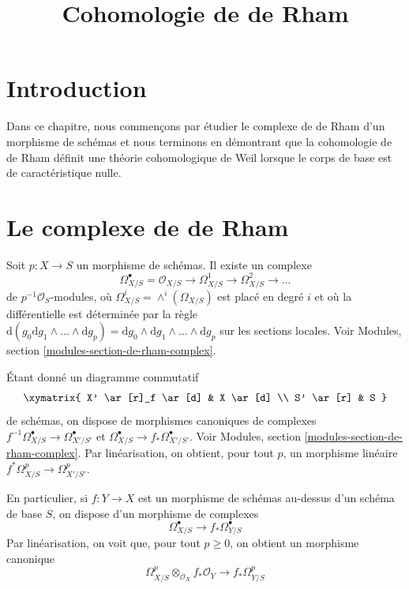 

%


\title{Cohomologie de de Rham}


\maketitle

\label{section-phantom}

\tableofcontents

\section{Introduction}
\label{section-introduction}

\noindent
Dans ce chapitre, nous commençons par étudier le complexe de de Rham
d'un morphisme de schémas et nous terminons en démontrant que la cohomologie
de de Rham définit une théorie cohomologique de Weil lorsque le corps de base est de caractéristique nulle.




\section{Le complexe de de Rham}
\label{section-de-rham-complex}

\noindent
Soit $p : X \to S$ un morphisme de schémas. Il existe un complexe
$$
\Omega^\bullet_{X/S} =
\mathcal{O}_{X/S} \to \Omega^1_{X/S} \to \Omega^2_{X/S} \to \ldots
$$
de $p^{-1}\mathcal{O}_S$-modules, où
$\Omega^i_{X/S} = \wedge^i(\Omega_{X/S})$
est placé en degré $i$ et où la différentielle est déterminée par la règle
$\text{d}(g_0 \text{d}g_1 \wedge \ldots \wedge \text{d}g_p) =
\text{d}g_0 \wedge \text{d}g_1 \wedge \ldots \wedge \text{d}g_p$
sur les sections locales.
Voir Modules, section \ref{modules-section-de-rham-complex}.

\medskip\noindent
Étant donné un diagramme commutatif
$$
\xymatrix{
X' \ar[r]_f \ar[d] & X \ar[d] \\
S' \ar[r] & S
}
$$
de schémas, on dispose de morphismes canoniques de complexes
$f^{-1}\Omega_{X/S}^\bullet \to \Omega^\bullet_{X'/S'}$ et
$\Omega_{X/S}^\bullet \to f_*\Omega^\bullet_{X'/S'}$.
Voir Modules, section \ref{modules-section-de-rham-complex}.
Par linéarisation, on obtient, pour tout $p$, un morphisme linéaire
$f^*\Omega^p_{X/S} \to \Omega^p_{X'/S'}$.

\medskip\noindent
En particulier, si $f : Y \to X$ est un morphisme de schémas au-dessus
d'un schéma de base $S$, on dispose d'un morphisme de complexes
$$
\Omega^\bullet_{X/S} \longrightarrow f_*\Omega^\bullet_{Y/S}
$$
Par linéarisation, on voit que, pour tout $p \geq 0$, on obtient un morphisme canonique
$$
\Omega^p_{X/S} \otimes_{\mathcal{O}_X} f_*\mathcal{O}_Y
\longrightarrow
f_*\Omega^p_{Y/S}
$$

